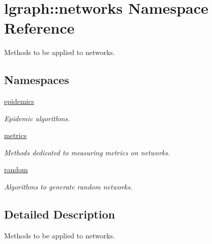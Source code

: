 \hypertarget{namespacelgraph_1_1networks}{}\section{lgraph\+:\+:networks Namespace Reference}
\label{namespacelgraph_1_1networks}


Methods to be applied to networks.  


\subsection*{Namespaces}
\begin{DoxyCompactItemize}
\item 
 \hyperlink{namespacelgraph_1_1networks_1_1epidemics}{epidemics}
\begin{DoxyCompactList}\small\item\em Epidemic algorithms. \end{DoxyCompactList}\item 
 \hyperlink{namespacelgraph_1_1networks_1_1metrics}{metrics}
\begin{DoxyCompactList}\small\item\em Methods dedicated to measuring metrics on networks. \end{DoxyCompactList}\item 
 \hyperlink{namespacelgraph_1_1networks_1_1random}{random}
\begin{DoxyCompactList}\small\item\em Algorithms to generate random networks. \end{DoxyCompactList}\end{DoxyCompactItemize}


\subsection{Detailed Description}
Methods to be applied to networks. 